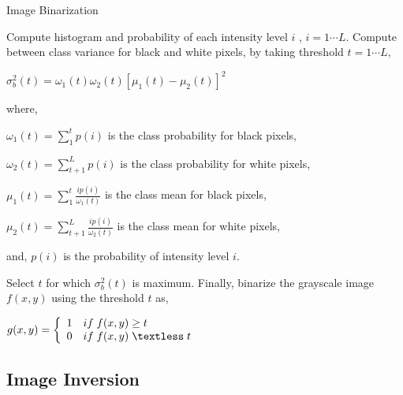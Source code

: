 \begin{algorithm}
\caption{Image Binarization}
\label{algorithm_segmentation}
\begin{algorithmic}[1]
\STATE  Compute histogram and probability of each intensity level $i$ , $i=1\cdots L$.
\STATE  Compute between class variance for black and white pixels, by taking threshold $ t=1\cdots L$, \par
\STATE \qquad $\sigma^2_b(t)=\omega_1(t)\omega_2(t)[\mu_1(t)-\mu_2(t)]^2$ \par
\qquad\qquad where,\par
\STATE \qquad\qquad\qquad $\omega_1(t)=\sum\limits_{1}^{t} p(i) $ is the class probability for black pixels,\par
\STATE \qquad\qquad\qquad $\omega_2(t)=\sum\limits_{t+1}^{L} p(i) $ is the class probability for white pixels,\par

\STATE \qquad\qquad\qquad $\mu_1(t)=\sum\limits_{1}^{t} \frac{ip(i)}{\omega_1(t)}$ is the class mean for black pixels,\par
\STATE \qquad\qquad\qquad $\mu_2(t)=\sum\limits_{t+1}^{L} \frac{ip(i)}{\omega_2(t)}$ is the class mean for white pixels,\par
\STATE \qquad\qquad\qquad and, $p(i)$ is the probability of intensity level $i$.

\STATE Select $t$ for which $\sigma^2_b(t)$ is maximum.
\STATE Finally, binarize the grayscale image $f(x,y)$ using the threshold $t$ as,\par
\STATE \qquad $g(x,y)=\left\{
\begin{array}{c l}
    1 & if \; f(x,y)\ge t\\
    0 & if \; f(x,y)\; \textless\;t
\end{array}\right.$


\end{algorithmic}
\end{algorithm}


\subsection{Image Inversion}\label{section_image_inversion}


